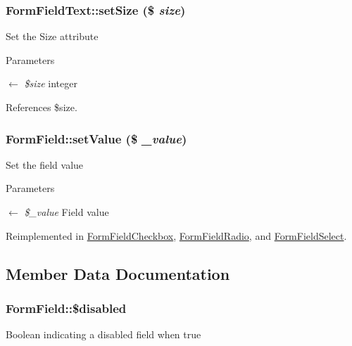 \subsubsection[{setSize}]{\setlength{\rightskip}{0pt plus 5cm}FormFieldText::setSize (\$ {\em size})}\label{classFormFieldText_a045b0853ed6e7777c7f3dddbadf31f5f}
Set the Size attribute 
\begin{DoxyParams}{Parameters}
\item[\mbox{$\leftarrow$} {\em \$size}]integer \end{DoxyParams}


References \$size.

\subsubsection[{setValue}]{\setlength{\rightskip}{0pt plus 5cm}FormField::setValue (\$ {\em \_\-value})}\label{classFormField_a465ff61e290d82be96bb793c3a14b3e7}
Set the field value 
\begin{DoxyParams}{Parameters}
\item[\mbox{$\leftarrow$} {\em \$\_\-value}]Field value \end{DoxyParams}


Reimplemented in \hyperlink{classFormFieldCheckbox_a787abee157599c389a18e0810f69fed5}{FormFieldCheckbox}, \hyperlink{classFormFieldRadio_aab105e92866fd80890d3254f51a2e4ca}{FormFieldRadio}, and \hyperlink{classFormFieldSelect_ae69f5b352df63796c048dca6a2de7544}{FormFieldSelect}.



\subsection{Member Data Documentation}
\subsubsection[{\$disabled}]{\setlength{\rightskip}{0pt plus 5cm}FormField::\$disabled}\label{classFormField_ab6f1907061890290e32cb2befc0a5f50}
Boolean indicating a disabled field when true 
